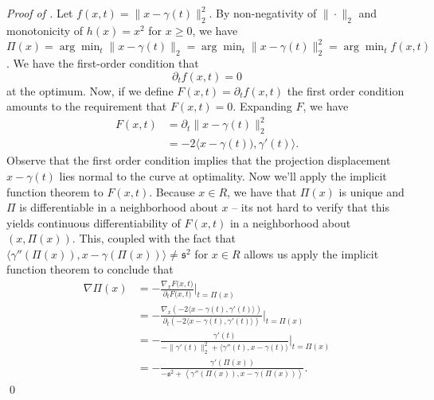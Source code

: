 \documentclass[11pt]{article}
\begin{document}
\begin{appendices}
\noindent \textit{Proof of .} Let $f(x,t) = \|x - \gamma(t)\|_2^2$. By non-negativity of $\|\cdot\|_2$ and monotonicity of $h(x) = x^2$ for $x \geq 0$, we have $\Pi(x) = \arg\min_t \|x - \gamma(t)\|_2 = \arg \min_t \|x - \gamma(t)\|_2^2 = \arg\min_t f(x, t)$. We have the first-order condition that 
\[ \partial_t f(x,t) = 0\]
at the optimum. Now, if we define $F(x, t) = \partial_t f(x,t)$ the first order condition amounts to the requirement that $F(x,t) = 0$. Expanding $F$, we have
\begin{align}
    F(x, t) &= \partial_t \|x - \gamma(t)\|_2^2 \\ \label{eq: ift}
    &= -2\langle x - \gamma(t)), \gamma'(t)\rangle.
\end{align}
Observe that the first order condition implies that the projection displacement $x - \gamma(t)$ lies normal to the curve at optimality. 
Now we'll apply the implicit function theorem to $F(x, t)$. Because $x \in R$, we have that $\Pi(x)$ is unique and $\Pi$ is differentiable in a neighborhood about $x$ -- its not hard to verify that this yields continuous differentiability of $F(x,t)$ in a neighborhood about $(x, \Pi(x))$. This, coupled with the fact that $\langle\gamma''(\Pi(x)), x - \gamma(\Pi(x))\rangle \neq \mathfrak s^2$ for $x\in R$ allows us apply the implicit function theorem to conclude that 
\begin{align}
    \nabla\Pi(x) &= - \frac{\nabla_x F\big(x, t\big)}{\partial_t F\big(x, t\big)} \Bigg|_{t = \Pi(x)}\\
    &= - \frac{\nabla_x\left(-2\langle x - \gamma(t), \gamma'(t)\rangle\right)}{\partial_t \left(-2\langle x - \gamma(t), \gamma'(t)\rangle\right)} \Bigg|_{t = \Pi(x)}\\
    &= -\frac{\gamma'(t)}{-\|\gamma'(t)\|_2^2 + 
    \langle\gamma''(t), x - \gamma(t)\rangle}\Bigg|_{t = \Pi(x)} \label{eq: projection grad} \\ 
    &= -\frac{\gamma'(\Pi(x))}{-\mathfrak s^2 + \left\langle\gamma''(\Pi(x)), x - \gamma(\Pi(x))\right\rangle}.
\end{align}
\qed{}



\end{appendices}
\end{document}
